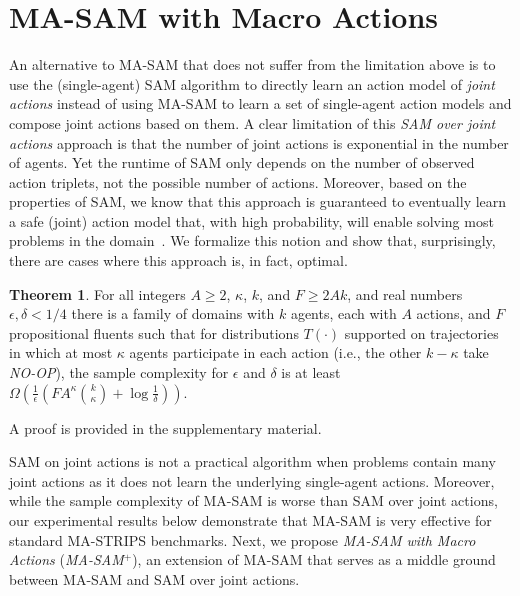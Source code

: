 \documentclass[letterpaper]{article} %
\theoremstyle{definition}
\newtheorem{theorem}{Theorem}
\theoremstyle{remark}
\newcommand{\noop}{\textit{NO-OP}\xspace}
\newcommand{\sam}{\ac{SAM}\xspace}
\newcommand{\masam}{\ac{MA-SAM}\xspace}
\newcommand{\cmasam}{\textit{MA-SAM\ensuremath{^+}}\xspace}
\begin{document}
\section{MA-SAM with Macro Actions}\label{sec:macrosam}
An alternative to \masam that does not suffer from the limitation above is to use the (single-agent) \sam algorithm 
to directly learn an action model of \emph{joint actions} instead of using \masam to learn a set of single-agent action models and compose joint actions based on them. 
A clear limitation of this \emph{\sam over joint actions} approach is that the number of joint actions is exponential in the number of agents. 
Yet the runtime of \sam only depends on the number of observed action triplets, not the possible number of actions. Moreover, based on the properties of \sam, we know that this approach is guaranteed to eventually learn a safe (joint) action model that, with high probability, will enable solving most problems in the domain~\cite{juba2021safe}. 
We formalize this notion and show that, surprisingly, there are cases where this approach is, in fact, optimal. 


\begin{theorem}
For all integers $A\geq 2$, $\kappa$, $k$, and $F\geq 2Ak$, and real numbers $\epsilon,\delta < 1/4$ there is a family of domains with $k$ agents, each with $A$ actions, and $F$ propositional fluents such that for distributions $T(\cdot)$ supported on trajectories in which at most $\kappa$ agents participate in each action (i.e., the other $k-\kappa$ take \noop), the sample complexity for $\epsilon$ and $\delta$ is at least $\Omega\left(\frac{1}{\epsilon}(FA^{\kappa}{k\choose\kappa}+\log\frac{1}{\delta})\right)$.
\end{theorem}
\noindent A proof is provided in the supplementary material. 

\sam on joint actions is not a practical algorithm when problems contain many joint actions as it does not learn the underlying single-agent actions.  
Moreover, while the sample complexity of \masam is worse than \sam over joint actions, our experimental results below demonstrate that \masam is very effective for standard MA-STRIPS benchmarks. 
Next, we propose \emph{\masam with Macro Actions} (\cmasam), an extension of \masam that serves as a middle ground between \masam and \sam over joint actions. 
\end{document}

